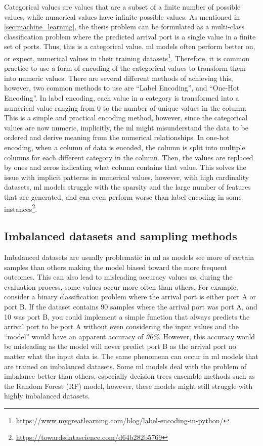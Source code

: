 Categorical values are values that are a subset of a finite number of possible values, while numerical values have infinite possible values. As mentioned in \cref{sec:machine_learning}, the thesis problem can be formulated as a multi-class classification problem where the predicted arrival port is a single value in a finite set of ports. Thus, this is a categorical value. \acrshort{ml} models often perform better on, or expect, numerical values in their training datasets\footnote{\url{https://www.mygreatlearning.com/blog/label-encoding-in-python/}}. Therefore, it is common practice to use a form of encoding of the categorical values to transform them into numeric values. There are several different methods of achieving this, however, two common methods to use are ``Label Encoding'', and ``One-Hot Encoding''. In label encoding, each value in a category is transformed into a numerical value ranging from 0 to the number of unique values in the column. This is a simple and practical encoding method, however, since the categorical values are now numeric, implicitly, the \acrshort{ml} might misunderstand the data to be ordered and derive meaning from the numerical relationships. In one-hot encoding, when a column of data is encoded, the column is split into multiple columns for each different category in the column. Then, the values are replaced by ones and zeros indicating what column contains that value. This solves the issue with implicit patterns in numerical values, however, with high cardinality datasets, \acrshort{ml} models struggle with the sparsity and the large number of features that are generated, and can even perform worse than label encoding in some instances\footnote{\url{https://towardsdatascience.com/d64b282b5769}}.


\subsection{Imbalanced datasets and sampling methods}

Imbalanced datasets are usually problematic in \acrshort{ml} as models see more of certain samples than others making the model biased toward the more frequent outcomes. This can also lead to misleading accuracy values as, during the evaluation process, some values occur more often than others. For example, consider a binary classification problem where the arrival port is either port A or port B. If the dataset contains 90 samples where the arrival port was port A, and 10 was port B, you could implement a simple function that always predicts the arrival port to be port A without even considering the input values and the ``model'' would have an apparent accuracy of \textit{90\%}. However, this accuracy would be misleading as the model will never predict port B as the arrival port no matter what the input data is. The same phenomena can occur in \acrshort{ml} models that are trained on imbalanced datasets. Some \acrshort{ml} models deal with the problem of imbalance better than others, especially decision trees ensemble methods such as the Random Forest (RF) model, however, these models might still struggle with highly imbalanced datasets.

